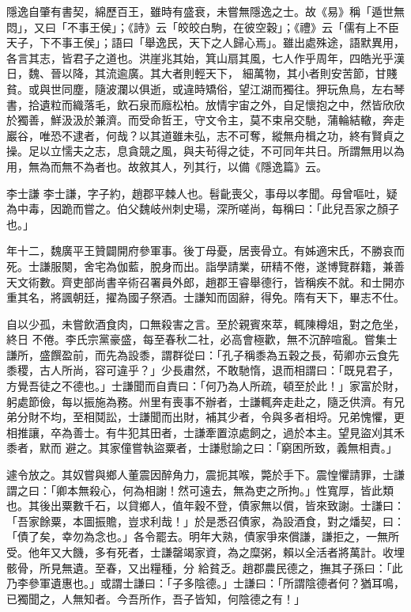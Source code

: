
\begin{pinyinscope}

 隱逸自肇有書契，綿歷百王，雖時有盛衰，未嘗無隱逸之士。故《易》稱「遁世無悶」，又曰「不事王侯」；《詩》云「皎皎白駒，在彼空穀」；《禮》云「儒有上不臣天子，下不事王侯」；語曰「舉逸民，天下之人歸心焉」。雖出處殊途，語默異用，各言其志，皆君子之道也。洪崖兆其始，箕山扇其風，七人作乎周年，四皓光乎漢日，魏、晉以降，其流逾廣。其大者則輕天下，
 細萬物，其小者則安苦節，甘賤貧。或與世同塵，隨波瀾以俱逝，或違時矯俗，望江湖而獨往。狎玩魚鳥，左右琴書，拾遺粒而織落毛，飲石泉而廕松柏。放情宇宙之外，自足懷抱之中，然皆欣欣於獨善，鮮汲汲於兼濟。而受命哲王，守文令主，莫不束帛交馳，蒲輪結轍，奔走巖谷，唯恐不逮者，何哉？以其道雖未弘，志不可奪，縱無舟楫之功，終有賢貞之操。足以立懦夫之志，息貪競之風，與夫茍得之徒，不可同年共日。所謂無用以為用，無為而無不為者也。故敘其人，列其行，以備《隱逸篇》云。



 李士謙
 李士謙，字子約，趙郡平棘人也。髫齔喪父，事母以孝聞。母曾嘔吐，疑為中毒，因跪而嘗之。伯父魏岐州刺史瑒，深所嗟尚，每稱曰：「此兒吾家之顏子也。」



 年十二，魏廣平王贊闢開府參軍事。後丁母憂，居喪骨立。有姊適宋氏，不勝哀而死。士謙服闋，舍宅為伽藍，脫身而出。詣學請業，研精不倦，遂博覽群籍，兼善天文術數。齊吏部尚書辛術召署員外郎，趙郡王睿舉德行，皆稱疾不就。和士開亦重其名，將諷朝廷，擢為國子祭酒。士謙知而固辭，得免。隋有天下，畢志不仕。



 自以少孤，未嘗飲酒食肉，口無殺害之言。至於親賓來萃，輒陳樽俎，對之危坐，終日
 不倦。李氏宗黨豪盛，每至春秋二社，必高會極歡，無不沉醉喧亂。嘗集士謙所，盛饌盈前，而先為設黍，謂群從曰：「孔子稱黍為五穀之長，荀卿亦云食先黍稷，古人所尚，容可違乎？」少長肅然，不敢馳惰，退而相謂曰：「既見君子，方覺吾徒之不德也。」士謙聞而自責曰：「何乃為人所疏，頓至於此！」家富於財，躬處節儉，每以振施為務。州里有喪事不辦者，士謙輒奔走赴之，隨乏供濟。有兄弟分財不均，至相鬩訟，士謙聞而出財，補其少者，令與多者相埒。兄弟愧懼，更相推讓，卒為善士。有牛犯其田者，士謙牽置涼處飼之，過於本主。望見盜刈其禾黍者，默而
 避之。其家僮嘗執盜粟者，士謙慰諭之曰：「窮困所致，義無相責。」



 遽令放之。其奴嘗與鄉人董震因醉角力，震扼其喉，斃於手下。震惶懼請罪，士謙謂之曰：「卿本無殺心，何為相謝！然可遠去，無為吏之所拘。」性寬厚，皆此類也。其後出粟數千石，以貸鄉人，值年穀不登，債家無以償，皆來致謝。士謙曰：「吾家餘粟，本圖振贍，豈求利哉！」於是悉召債家，為設酒食，對之燔契，曰：「債了矣，幸勿為念也。」各令罷去。明年大熟，債家爭來償謙，謙拒之，一無所受。他年又大饑，多有死者，士謙罄竭家資，為之糜粥，賴以全活者將萬計。收埋骸骨，所見無遺。至春，又出糧種，分
 給貧乏。趙郡農民德之，撫其子孫曰：「此乃李參軍遺惠也。」或謂士謙曰：「子多陰德。」士謙曰：「所謂陰德者何？猶耳鳴，已獨聞之，人無知者。今吾所作，吾子皆知，何陰德之有！」




\end{pinyinscope}
